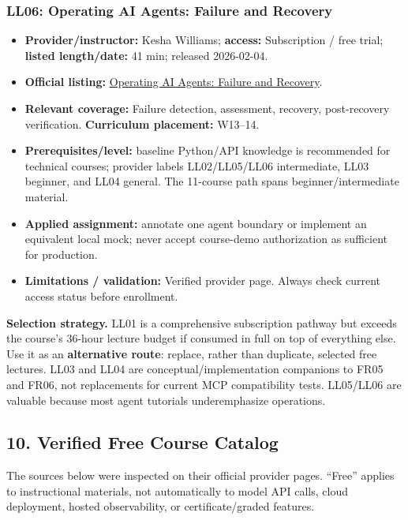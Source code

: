 \documentclass[
  10pt,
]{article}
\providecommand{\tightlist}{%
  \setlength{\itemsep}{0pt}\setlength{\parskip}{0pt}}
\begin{document}
\subsubsection{LL06: Operating AI Agents: Failure and
Recovery}\label{ll06-operating-ai-agents-failure-and-recovery}

\begin{itemize}
\tightlist
\item
  \textbf{Provider/instructor:} Kesha Williams; \textbf{access:}
  Subscription / free trial; \textbf{listed length/date:} 41 min;
  released 2026-02-04.
\item
  \textbf{Official listing:}
  \href{https://www.linkedin.com/learning/operating-ai-agents-failure-and-recovery}{Operating
  AI Agents: Failure and Recovery}.
\item
  \textbf{Relevant coverage:} Failure detection, assessment, recovery,
  post-recovery verification. \textbf{Curriculum placement:} W13--14.
\item
  \textbf{Prerequisites/level:} baseline Python/API knowledge is
  recommended for technical courses; provider labels LL02/LL05/LL06
  intermediate, LL03 beginner, and LL04 general. The 11-course path
  spans beginner/intermediate material.
\item
  \textbf{Applied assignment:} annotate one agent boundary or implement
  an equivalent local mock; never accept course-demo authorization as
  sufficient for production.
\item
  \textbf{Limitations / validation:} Verified provider page. Always
  check current access status before enrollment.
\end{itemize}

\textbf{Selection strategy.} LL01 is a comprehensive subscription
pathway but exceeds the course's 36-hour lecture budget if consumed in
full on top of everything else. Use it as an \textbf{alternative route}:
replace, rather than duplicate, selected free lectures. LL03 and LL04
are conceptual/implementation companions to FR05 and FR06, not
replacements for current MCP compatibility tests. LL05/LL06 are valuable
because most agent tutorials underemphasize operations.

\subsection{10. Verified Free Course
Catalog}\label{verified-free-course-catalog}

The sources below were inspected on their official provider pages.
``Free'' applies to instructional materials, not automatically to model
API calls, cloud deployment, hosted observability, or certificate/graded
features.
\end{document}
